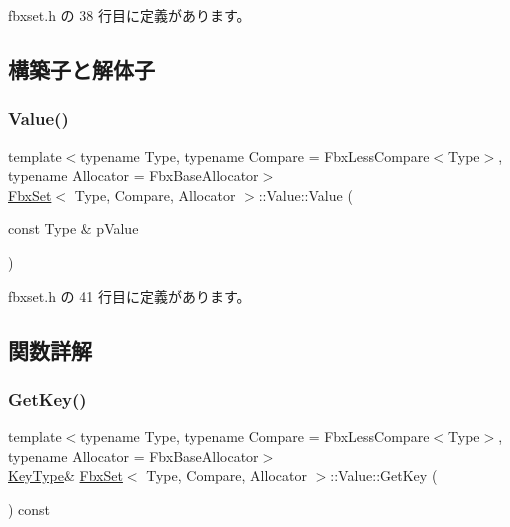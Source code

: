  fbxset.\+h の 38 行目に定義があります。



\subsection{構築子と解体子}
\mbox{\label{class_fbx_set_1_1_value_a3503d6fb6173a58a0b8b93c8413710c1}} 
\subsubsection{\texorpdfstring{Value()}{Value()}}
{\footnotesize\ttfamily template$<$typename Type, typename Compare = Fbx\+Less\+Compare$<$\+Type$>$, typename Allocator = Fbx\+Base\+Allocator$>$ \\
\hyperlink{class_fbx_set}{Fbx\+Set}$<$ Type, Compare, Allocator $>$\+::Value\+::\+Value (\begin{DoxyParamCaption}\item[{const Type \&}]{p\+Value }\end{DoxyParamCaption})\hspace{0.3cm}{\ttfamily [inline]}}



 fbxset.\+h の 41 行目に定義があります。



\subsection{関数詳解}
\mbox{\label{class_fbx_set_1_1_value_a498538bf1bf1d1c9fd4b85853e92ff62}} 
\subsubsection{\texorpdfstring{Get\+Key()}{GetKey()}\hspace{0.1cm}{\footnotesize\ttfamily [1/2]}}
{\footnotesize\ttfamily template$<$typename Type, typename Compare = Fbx\+Less\+Compare$<$\+Type$>$, typename Allocator = Fbx\+Base\+Allocator$>$ \\
\hyperlink{class_fbx_set_1_1_value_ad4958bd8730776f19c1309f457158acf}{Key\+Type}\& \hyperlink{class_fbx_set}{Fbx\+Set}$<$ Type, Compare, Allocator $>$\+::Value\+::\+Get\+Key (\begin{DoxyParamCaption}{ }\end{DoxyParamCaption}) const\hspace{0.3cm}{\ttfamily [inline]}}



